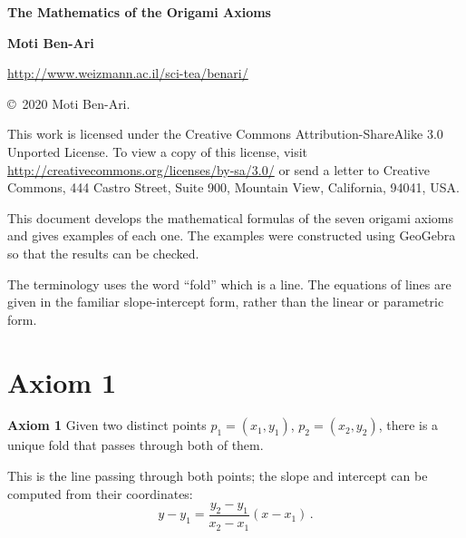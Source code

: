 \documentclass[11pt,a4paper]{article}
\newcommand*{\disfrac}[2]{\displaystyle\frac{#1}{#2}}
\begin{document}
\thispagestyle{empty}

\vspace*{2ex}

\begin{center}


\textbf{\LARGE The Mathematics of the Origami Axioms}

\bigskip
\bigskip

\textbf{\Large Moti Ben-Ari}

\bigskip
\bigskip

\url{http://www.weizmann.ac.il/sci-tea/benari/}

\end{center}



\begin{footnotesize}
\begin{center}
\copyright{}\ 2020 Moti Ben-Ari.
\end{center}

This work is licensed under the Creative Commons Attribution-ShareAlike 3.0 Unported License. To view a copy of this license, visit \url{http://creativecommons.org/licenses/by-sa/3.0/} or send a letter to Creative Commons, 444 Castro Street, Suite 900, Mountain View, California, 94041, USA.
\end{footnotesize}


This document develops the mathematical formulas of the seven origami axioms and gives examples of each one. The examples were constructed using GeoGebra so that the results can be checked.

The terminology uses the word ``fold'' which is a line.  The equations of lines are given in the familiar slope-intercept form, rather than the linear or parametric form.

\section{Axiom 1}


\textbf{Axiom 1} 
Given two distinct points $p_1=(x_1,y_1)$, $p_2=(x_2,y_2)$, there is a unique fold that passes through both of them.

This is the line passing through both points; the slope and intercept can be computed from their coordinates:
\begin{equation}
y - y_1 = \disfrac{y_2-y_1}{x_2-x_1}(x-x_1)\,.
\end{equation}
\end{document}
